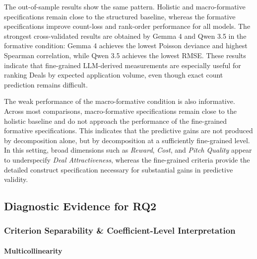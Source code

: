 The out-of-sample results show the same pattern. Holistic and macro-formative specifications remain close to the structured baseline, whereas the formative specifications improve count-loss and rank-order performance for all models. The strongest cross-validated results are obtained by Gemma 4 and Qwen 3.5 in the formative condition: Gemma 4 achieves the lowest Poisson deviance and highest Spearman correlation, while Qwen 3.5 achieves the lowest RMSE. These results indicate that fine-grained LLM-derived measurements are especially useful for ranking Deals by expected application volume, even though exact count prediction remains difficult.


The weak performance of the macro-formative condition is also informative. Across most comparisons, macro-formative specifications remain close to the holistic baseline and do not approach the performance of the fine-grained formative specifications. This indicates that the predictive gains are not produced by decomposition alone, but by decomposition at a sufficiently fine-grained level. In this setting, broad dimensions such as \textit{Reward}, \textit{Cost}, and \textit{Pitch Quality} appear to underspecify \textit{Deal Attractiveness}, whereas the fine-grained criteria provide the detailed construct specification necessary for substantial gains in predictive validity.



\subsection{Diagnostic Evidence for RQ2}

\subsubsection{Criterion Separability \& Coefficient-Level Interpretation}

\paragraph{Multicollinearity}


